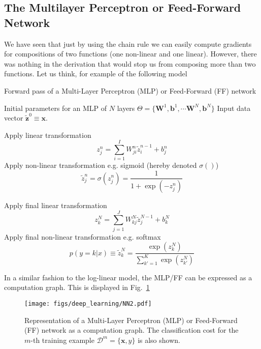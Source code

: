 \subsection{The Multilayer Perceptron or Feed-Forward Network}

We have seen that just by using the chain rule we can easily compute gradients for
compositions of two functions (one non-linear and one linear). However, there
was nothing in the derivation that would stop us from composing more than two
functions. Let us think, for example of the following model

\begin{algorithm}[th!]
   \caption{Forward pass of a Multi-Layer Perceptron (MLP) or Feed-Forward (FF) network}
\begin{algorithmic}[1]
\label{algo:mlpforward}

    Initial parameters for an MLP of $N$ layers $\Theta=\{\mathbf{W}^1, \mathbf{b}^1, \cdots \mathbf{W}^N, \mathbf{b}^N\}$
    Input data vector $\mathbf{\tilde{z}}^{0}  \equiv \mathbf{x}$.

     \STATE Apply  linear transformation
        $$z_j^n = \sum_{i=1}^{I} W_{ji}^n \tilde{z}_i^{n-1} + b_j^n$$
     \STATE Apply non-linear transformation e.g. sigmoid (hereby denoted $\sigma()$)
     $$\tilde{z}_j^n = \sigma(z_j^n)  = \frac{1}{1+\exp(-z_j^n)}$$

	\ENDFOR

\STATE Apply final linear transformation
   $$z_k^N = \sum_{j=1}^{J} W_{kj}^N \tilde{z}_j^{N-1} + b_k^N$$
\STATE Apply final non-linear transformation e.g. softmax
$$p(y=k|{x}) \equiv \tilde{z}_k^N = \frac{\exp(z_k^N)}{\sum_{k'=1}^{K} \exp(z_{k'}^N)}$$

\end{algorithmic}
\end{algorithm}

\noindent In a similar fashion to the log-linear model, the MLP/FF can be expressed as a computation graph. This is displayed in Fig.~\ref{fig:FF}

\begin{figure}[!hb]
\centering
\texttt{[image: figs/deep\_learning/NN2.pdf]}
\caption{Representation of a Multi-Layer Perceptron (MLP) or Feed-Forward (FF) network as a computation graph. The classification cost
for the $m$-th training example $\mathcal{D}^m=\{\mathbf{x}, y\}$ is also
shown.}
\label{fig:FF}
\end{figure}

